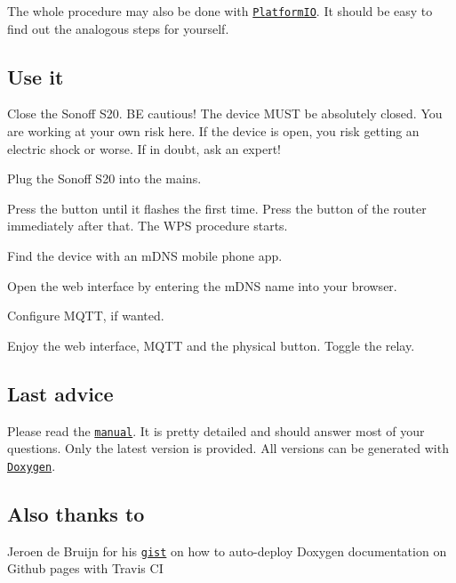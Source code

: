 The whole procedure may also be done with \href{https://platformio.org/}{\tt Platform\-I\-O}. It should be easy to find out the analogous steps for yourself.

\subsection*{Use it}


\begin{DoxyEnumerate}
\item Close the Sonoff S20. B\-E cautious! The device M\-U\-S\-T be absolutely closed. You are working at your own risk here. If the device is open, you risk getting an electric shock or worse. If in doubt, ask an expert!
\item Plug the Sonoff S20 into the mains.
\item Press the button until it flashes the first time. Press the button of the router immediately after that. The W\-P\-S procedure starts.
\item Find the device with an m\-D\-N\-S mobile phone app.
\item Open the web interface by entering the m\-D\-N\-S name into your browser.
\item Configure M\-Q\-T\-T, if wanted.
\item Enjoy the web interface, M\-Q\-T\-T and the physical button. Toggle the relay.
\end{DoxyEnumerate}

\subsection*{Last advice}

Please read the \href{https://peastone.github.io/WIFIOnOff/}{\tt manual}. It is pretty detailed and should answer most of your questions. Only the latest version is provided. All versions can be generated with \href{https://www.stack.nl/~dimitri/doxygen/}{\tt Doxygen}.

\subsection*{Also thanks to}


\begin{DoxyItemize}
\item Jeroen de Bruijn for his \href{https://gist.github.com/vidavidorra/548ffbcdae99d752da02}{\tt gist} on how to auto-\/deploy Doxygen documentation on Github pages with Travis C\-I 
\end{DoxyItemize}